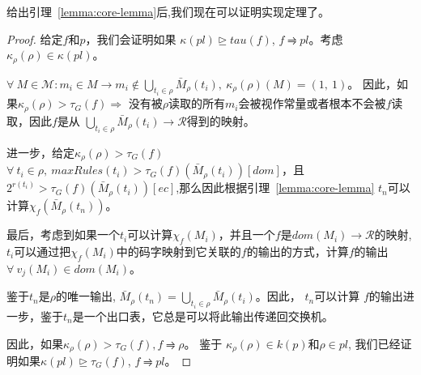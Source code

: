 \documentclass{ctexart}
\newtheorem{proof}{证明}
\begin{document}
%
%
%

给出引理~\ref{lemma:core-lemma}后,我们现在可以证明实现定理了。

\begin{proof}
给定$f$和$p$，我们会证明如果 $\kappa(pl)\trianglerighteq tau(f)$, $f \rightrightharpoons pl$。考虑 $\kappa_\rho(\rho) \in \kappa(pl)$。

$\forall\ M \in \mathcal{M} : m_i \in M \rightarrow m_i \notin \bigcup_{t_i \in \rho} \bar{M}_\rho(t_i),\ \kappa_\rho(\rho)(M) = (1,\ 1)$。 因此，如果$\kappa_\rho(\rho) > \tau_G(f) \Rightarrow$ 没有被$\rho$读取的所有$m_i$会被视作常量或者根本不会被$f$读取，因此$f$是从 $\bigcup_{t_i \in \rho} \bar{M}_\rho(t_i) \rightarrow \mathcal{R}$得到的映射。 

进一步，给定$\kappa_\rho(\rho) > \tau_G(f)$ $\forall\ t_i \in \rho,\ maxRules(t_i) > \tau_G(f)(\bar{M}_\rho(t_i))[dom]$，且$2^{r(t_i)} > \tau_G(f)(\bar{M}_\rho(t_i))[ec]$,那么因此根据引理~\ref{lemma:core-lemma} $t_n$可以计算$\chi_f(\bar{M}_\rho(t_n))$。

最后，考虑到如果一个$t_i$可以计算$\chi_f(M_i)$，并且一个$f$是$dom(M_i) \rightarrow \mathcal{R}$的映射, $t_i$可以通过把$\chi_f(M_i)$中的码字映射到它关联的$f$的输出的方式，计算$f$的输出$\forall\ v_j(M_i) \in dom(M_i)$。

鉴于$t_n$是$\rho$的唯一输出, $\bar{M}_\rho(t_n) = \bigcup_{t_i \in \rho} \bar{M}_\rho(t_i)$。因此， $t_n$可以计算 $f$的输出进一步，鉴于$t_n$是一个出口表，它总是可以将此输出传递回交换机。

因此，如果$\kappa_\rho(\rho) > \tau_G(f), f \rightrightharpoons \rho$。 鉴于 $\kappa_\rho(\rho) \in k(p)$和$\rho \in pl$, 我们已经证明如果$\kappa(pl)\trianglerighteq \tau_G(f)$, $f \rightrightharpoons pl$。
\end{proof}
\end{document}
